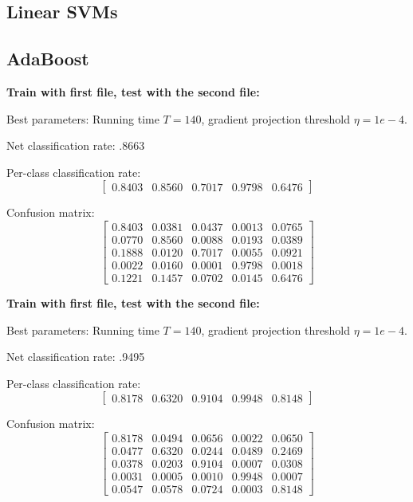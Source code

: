 \documentclass[letterpaper]{article}
\begin{document}
\subsection*{Linear SVMs}

\subsection*{AdaBoost}

\textbf{Train with first file, test with the second file:}

Best parameters: Running time $T=140$, gradient projection threshold $\eta=1e-4$.

Net classification rate: .8663

Per-class classification rate: 
$$\begin{bmatrix} 0.8403  &  0.8560   & 0.7017 &   0.9798  &  0.6476\end{bmatrix}$$

Confusion matrix:
$$\begin{bmatrix}
    0.8403 &   0.0381  &  0.0437  &  0.0013  &  0.0765\\
    0.0770  &  0.8560   & 0.0088   & 0.0193  &  0.0389\\
    0.1888  &  0.0120   & 0.7017   & 0.0055  &  0.0921\\
    0.0022  &  0.0160   & 0.0001   & 0.9798  &  0.0018\\
    0.1221  &  0.1457   & 0.0702   & 0.0145  &  0.6476
\end{bmatrix}$$

\textbf{Train with first file, test with the second file:}

Best parameters: Running time $T=140$, gradient projection threshold $\eta=1e-4$.

Net classification rate: .9495

Per-class classification rate: 
$$\begin{bmatrix}0.8178 &   0.6320 &   0.9104  &  0.9948  &  0.8148\end{bmatrix}$$

Confusion matrix:
$$\begin{bmatrix}
0.8178 &   0.0494   & 0.0656 &   0.0022  &  0.0650\\
    0.0477 &   0.6320  &  0.0244 &   0.0489 &   0.2469\\
    0.0378 &   0.0203 &   0.9104  &  0.0007  &  0.0308\\
    0.0031  &  0.0005 &   0.0010  &  0.9948  &  0.0007\\
    0.0547  &  0.0578   & 0.0724  &  0.0003  &  0.8148
\end{bmatrix}$$
\end{document}
